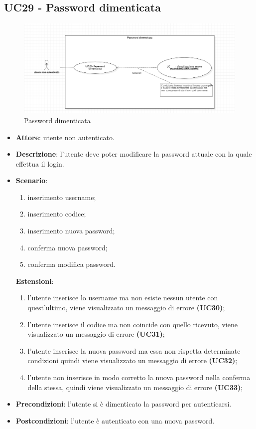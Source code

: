 
\subsection{UC29 - Password dimenticata}

\begin{figure}[H]
    \includegraphics[width=15cm]{sezioni/Images/dimenticata_psw.png}
    \centering
    \caption{Password dimenticata}
\end{figure}

\begin{itemize}
    \item \textbf{Attore}: utente non autenticato.
    \item \textbf{Descrizione}: l'utente deve poter modificare la password attuale con la quale effettua il login.
    \item \textbf{Scenario}:
    \begin{enumerate}
        \item inserimento username;
        \item inserimento codice;
        \item inserimento nuova password;
        \item conferma nuova password;
        \item conferma modifica password.
    \end{enumerate}
    \textbf{Estensioni}:
    \begin{enumerate}
        \item l'utente inserisce lo username ma non esiste nessun utente con quest'ultimo, viene visualizzato un messaggio di errore \textbf{(UC30)};
        \item l'utente inserisce il codice ma non coincide con quello ricevuto, viene visualizzato un messaggio di errore \textbf{(UC31)};
        \item l'utente inserisce la nuova password ma essa non rispetta determinate condizioni quindi viene visualizzato un messaggio di errore \textbf{(UC32)};
        \item l'utente non inserisce in modo corretto la nuova password nella conferma della stessa, quindi viene visualizzato un messaggio di errore \textbf{(UC33)};
    \end{enumerate}

    \item \textbf{Precondizioni}: l'utente si è dimenticato la password per autenticarsi.
    \item \textbf{Postcondizioni}: l'utente è autenticato con una nuova password.
\end{itemize}

